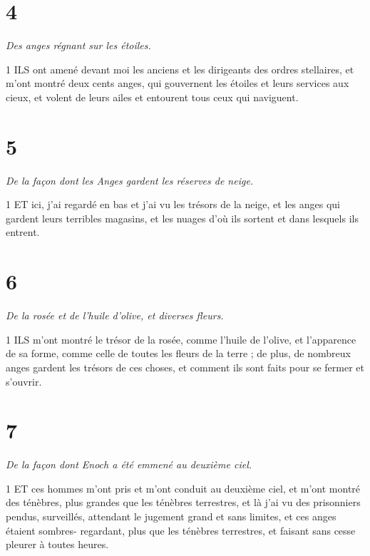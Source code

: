 \chapter{4}

\par \textit{Des anges régnant sur les étoiles.}

\par 1 ILS ont amené devant moi les anciens et les dirigeants des ordres stellaires, et m'ont montré deux cents anges, qui gouvernent les étoiles et leurs services aux cieux, et volent de leurs ailes et entourent tous ceux qui naviguent.

\chapter{5}

\par \textit{De la façon dont les Anges gardent les réserves de neige.}

\par 1 ET ici, j'ai regardé en bas et j'ai vu les trésors de la neige, et les anges qui gardent leurs terribles magasins, et les nuages ​​d'où ils sortent et dans lesquels ils entrent.

\chapter{6}

\par \textit{De la rosée et de l'huile d'olive, et diverses fleurs.}

\par 1 ILS m'ont montré le trésor de la rosée, comme l'huile de l'olive, et l'apparence de sa forme, comme celle de toutes les fleurs de la terre ; de plus, de nombreux anges gardent les trésors de ces choses, et comment ils sont faits pour se fermer et s'ouvrir.

\chapter{7}

\par \textit{De la façon dont Enoch a été emmené au deuxième ciel.}

\par 1 ET ces hommes m'ont pris et m'ont conduit au deuxième ciel, et m'ont montré des ténèbres, plus grandes que les ténèbres terrestres, et là j'ai vu des prisonniers pendus, surveillés, attendant le jugement grand et sans limites, et ces anges étaient sombres- regardant, plus que les ténèbres terrestres, et faisant sans cesse pleurer à toutes heures.

